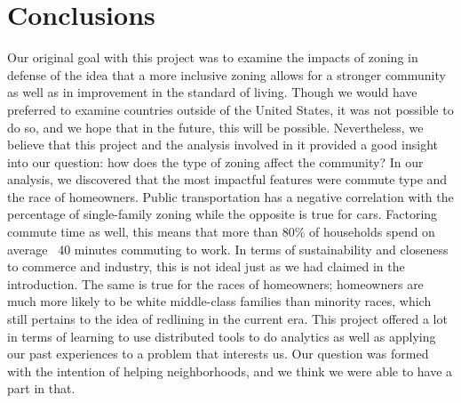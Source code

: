 \documentclass[titlepage]{article}
\begin{document}
\section{Conclusions}
Our original goal with this project was to examine the impacts of zoning in defense of the idea that a more inclusive zoning allows for a stronger community as well as in improvement in the standard of living. Though we would have preferred to examine countries outside of the United States, it was not possible to do so, and we hope that in the future, this will be possible. Nevertheless, we believe that this project and the analysis involved in it provided a good insight into our question: how does the type of zoning affect the community? In our analysis, we discovered that the most impactful features were commute type and the race of homeowners. Public transportation has a negative correlation with the percentage of single-family zoning while the opposite is true for cars. Factoring commute time as well, this means that more than 80\% of households spend on average ~40 minutes commuting to work. In terms of sustainability and closeness to commerce and industry, this is not ideal just as we had claimed in the introduction. The same is true for the races of homeowners; homeowners are much more likely to be white middle-class families than minority races, which still pertains to the idea of redlining in the current era. This project offered a lot in terms of learning to use distributed tools to do analytics as well as applying our past experiences to a problem that interests us. Our question was formed with the intention of helping neighborhoods, and we think we were able to have a part in that.



\end{document}
